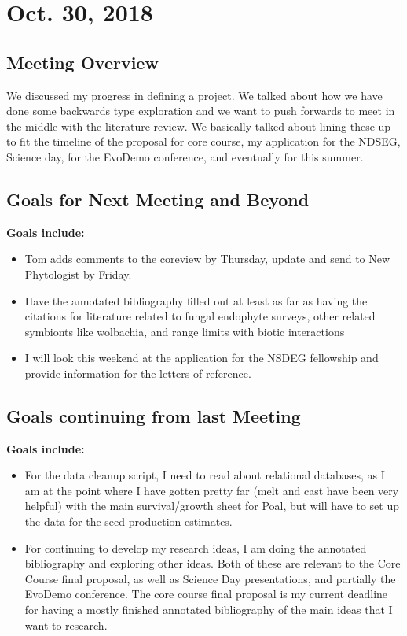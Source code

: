 \documentclass{article}
\begin{document}
\section*{Oct. 30, 2018}

\subsection*{Meeting Overview}

We discussed my progress in defining a project. We talked about how we have done some backwards type exploration and we want to push forwards to meet in the middle with the literature review. We basically talked about lining these up to fit the timeline of the proposal for core course, my application for the NDSEG, Science day, for the EvoDemo conference, and eventually for this summer.
 
\subsection*{Goals for Next Meeting and Beyond}
\textbf{Goals include:} 
\begin{itemize}
\item{Tom adds comments to the coreview by Thursday, update and send to New Phytologist by Friday.}
\item{Have the annotated bibliography filled out at least as far as having the citations for literature related to fungal endophyte surveys, other related symbionts like wolbachia, and range limits with biotic interactions}
\item{I will look this weekend at the application for the NSDEG fellowship and provide information for the letters of reference.}
\end{itemize}

\subsection*{Goals continuing from last Meeting}
\textbf{Goals include:} 
\begin{itemize}
\item{For the data cleanup script, I need to read about relational databases, as I am at the point where I have gotten pretty far (melt and cast have been very helpful) with the main survival/growth sheet for Poal, but will have to set up the data for the seed production estimates.}
\item{For continuing to develop my research ideas, I am doing the annotated bibliography and exploring other ideas. Both of these are relevant to the Core Course final proposal, as well as Science Day presentations, and partially the EvoDemo conference. The core course final proposal is my current deadline for having a mostly finished annotated bibliography of the main ideas that I want to research.}
\end{itemize}
\end{document}
